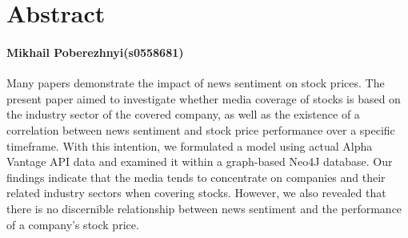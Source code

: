 \chapter{Abstract}
\subsubsection*{Mikhail Poberezhnyi(s0558681)}
\label{cha:abstract}

Many papers demonstrate the impact of news sentiment on stock prices. The present paper aimed to investigate whether media coverage of stocks is based on the industry sector of the covered company, as well as the existence of a correlation between news sentiment and stock price performance over a specific timeframe. With this intention, we formulated a model using actual Alpha Vantage API data and examined it within a graph-based Neo4J database. Our findings indicate that the media tends to concentrate on companies and their related industry sectors when covering stocks. However, we also revealed that there is no discernible relationship between news sentiment and the performance of a company's stock price.

